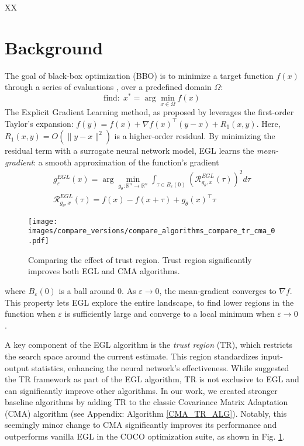 XX\section{Background} \label{background}
The goal of black-box optimization (BBO) is to minimize a target function \(f(x)\) through a series of evaluations \cite{audet2017introduction}, over a predefined domain $\Omega$:
\begin{equation}
    \text{find:}\ \  x^\ast=\arg\min_{x \in \Omega}f(x)
\end{equation}
The Explicit Gradient Learning method, as proposed by \cite{sarafian2020explicit} leverages the first-order Taylor’s expansion: $f(y) = f(x) + \nabla f(x)^\top(y-x) + R_1(x, y)$. Here, $R_1(x, y)=O(\|y-x\|^2)$ is a higher-order residual. By minimizing the residual term with a surrogate neural network model, EGL learns the \textit{mean-gradient}: a smooth approximation of the function's gradient
\begin{equation}
\begin{aligned}
\label{EGL_surrogate}
 g^{EGL}_{\varepsilon}(x) = \arg\min_{g_{\theta}:\mathbb{R}^n \rightarrow \mathbb{R}^n}\int_{\tau \in B_\varepsilon(0)} (\mathcal{R}_{g_\theta, x}^{EGL}(\tau))^2 d\tau\\
\mathcal{R}_{g_\theta, x}^{EGL}(\tau) = f(x) - f(x + \tau) + g_{\theta}(x)^\top \tau
\end{aligned}
\end{equation}
\begin{figure}[ht]
    \vskip 0.2in
    \centering
    \texttt{[image: images/compare\_versions/compare\_algorithms\_compare\_tr\_cma\_0.pdf]}
    \caption{Comparing the effect of trust region. Trust region significantly improves both EGL and CMA algorithms.}
    \label{fig:compare_effects}
    \vskip -0.2in
\end{figure}

where \(B_\varepsilon(0)\) is a ball around \(0\). As \(\varepsilon\to 0\), the mean-gradient converges to \(\nabla f\). This property lets EGL explore the entire landscape, to find lower regions in the function when \(\varepsilon\) is sufficiently large and converge to a local minimum when \(\varepsilon \to 0\).

A key component of the EGL algorithm is the \textit{trust region} (TR), which restricts the search space around the current estimate. This region standardizes input-output statistics, enhancing the neural network's effectiveness. While \cite{sarafian2020explicit} suggested the TR framework as part of the EGL algorithm, TR is not exclusive to EGL and can significantly improve other algorithms. In our work, we created stronger baseline algorithms by adding TR to the classic Covariance Matrix Adaptation (CMA) algorithm (see Appendix: Algorithm \ref{CMA_TR_ALG}). Notably, this seemingly minor change to CMA significantly improves its performance and outperforms vanilla EGL in the COCO optimization suite, as shown in Fig. \ref{fig:compare_effects}.